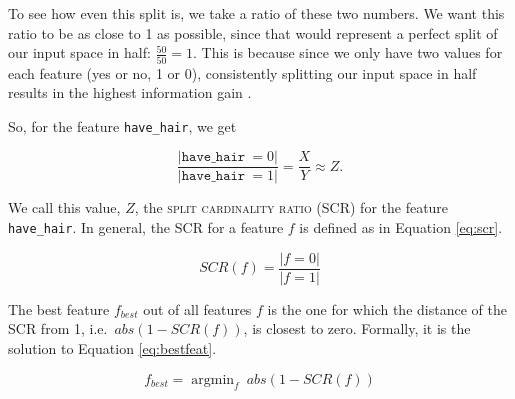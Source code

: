 \documentclass[11pt,a4paper]{article}
\DeclareMathOperator*{\argmin}{argmin}
\newcommand{\havehair}{\texttt{have\_hair}}
\begin{document}
To see how even this split is, we take a ratio of these two numbers.
We want this ratio to be as close to 1 as possible, since that would represent a perfect split of our input space in half: $\frac{50}{50} = 1$.
This is because since we only have two values for each feature (yes or no, 1 or 0), consistently splitting our input space in half results in the highest information gain \citep[cf.][]{Quinlan1986, Bishop2006}.

So, for the feature \havehair, we get

$$\frac{|\havehair\ = 0|}{|\havehair\ = 1|} = \frac{X}{Y} \approx Z.$$

We call this value, $Z$, the \textsc{split cardinality ratio} (SCR) for the feature \havehair.
In general, the SCR for a feature $f$ is defined as in Equation \ref{eq:scr}.

\begin{equation}
SCR(f) = \frac{|f = 0|}{|f = 1|} 
\label{eq:scr}
\end{equation}

The best feature $f_{best}$ out of all features $f$ is the one for which the distance of the SCR from 1, i.e.\ $abs(1 - SCR(f))$, is closest to zero.
Formally, it is the solution to Equation \ref{eq:bestfeat}.

\begin{equation}
f_{best} = \argmin_f\ abs(1 - SCR(f)) 
\label{eq:bestfeat}
\end{equation}



%
%
\end{document}
